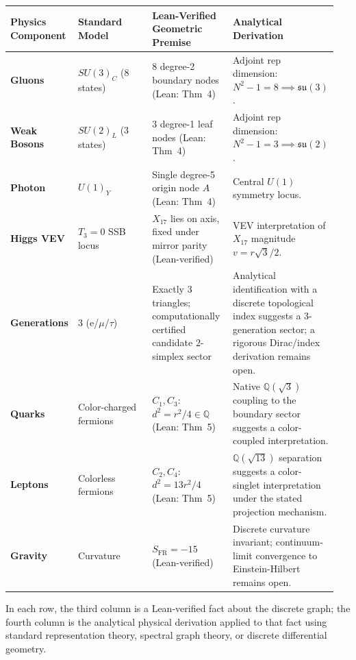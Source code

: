 \documentclass[12pt, a4paper]{article}
\begin{document}
\begin{table}[htbp]
\centering
\renewcommand{\arraystretch}{1.3}
\begin{tabular}{@{}p{0.15\linewidth} p{0.25\linewidth} p{0.25\linewidth} p{0.3\linewidth}@{}}
\toprule
\textbf{Physics Component} & \textbf{Standard Model} & \textbf{Lean-Verified Geometric Premise} & \textbf{Analytical Derivation} \\
\midrule
\textbf{Gluons} & $SU(3)_C$ (8 states) & 8 degree-2 boundary nodes (Lean: Thm~4) & Adjoint rep dimension: $N^2-1=8 \implies \mathfrak{su}(3)$. \\
\textbf{Weak Bosons} & $SU(2)_L$ (3 states) & 3 degree-1 leaf nodes (Lean: Thm~4) & Adjoint rep dimension: $N^2-1=3 \implies \mathfrak{su}(2)$. \\
\textbf{Photon} & $U(1)_Y$ & Single degree-5 origin node $A$ (Lean: Thm~4) & Central $U(1)$ symmetry locus. \\
\textbf{Higgs VEV} & $T_3=0$ SSB locus & $X_{17}$ lies on axis, fixed under mirror parity (Lean-verified) & VEV interpretation of $X_{17}$ magnitude $v = r\sqrt{3}/2$. \\
\textbf{Generations} & 3 (e/$\mu$/$\tau$) & Exactly 3 triangles; computationally certified candidate 2-simplex sector & Analytical identification with a discrete topological index suggests a 3-generation sector; a rigorous Dirac/index derivation remains open. \\
\textbf{Quarks} & Color-charged fermions & $C_1, C_3$: $d^2 = r^2/4 \in \mathbb{Q}$ (Lean: Thm~5) & Native $\mathbb{Q}(\sqrt{3})$ coupling to the boundary sector suggests a color-coupled interpretation. \\
\textbf{Leptons} & Colorless fermions & $C_2, C_4$: $d^2 = 13r^2/4$ (Lean: Thm~5) & $\mathbb{Q}(\sqrt{13})$ separation suggests a color-singlet interpretation under the stated projection mechanism. \\
\textbf{Gravity} & Curvature & $S_{\text{FR}} = -15$ (Lean-verified) & Discrete curvature invariant; continuum-limit convergence to Einstein-Hilbert remains open. \\
\bottomrule
\end{tabular}
\end{table}

\noindent In each row, the third column is a Lean-verified fact about the discrete graph; the fourth column is the analytical physical derivation applied to that fact using standard representation theory, spectral graph theory, or discrete differential geometry.
\end{document}
